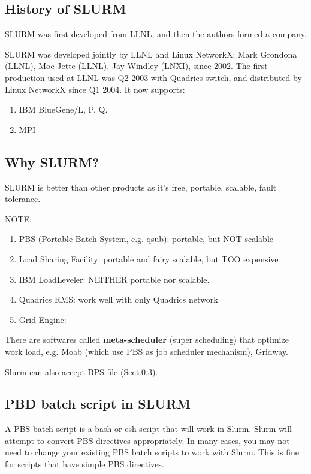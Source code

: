 \subsection{History of SLURM}
\label{sec:SLURM-history}

SLURM was first developed from LLNL, and then the authors formed a company.

SLURM was developed jointly by LLNL and Linux NetworkX: Mark Grondona (LLNL),
Moe Jette (LLNL), Jay Windley (LNXI), since 2002. The first production used at
LLNL was Q2 2003 with Quadrics switch, and distributed by Linux NetworkX since
Q1 2004. It now supports:
\begin{enumerate}
  \item IBM BlueGene/L, P, Q.
  \item MPI
\end{enumerate}


\subsection{Why SLURM?}
\label{sec:SLURM-why-it}

SLURM is better than other products as it's free, portable, scalable, fault
tolerance.

NOTE:
\begin{enumerate}
  \item PBS (Portable Batch System, e.g. qsub): portable, but NOT scalable
  \item Load Sharing Facility: portable and fairy scalable, but TOO expensive
  \item IBM LoadLeveler: NEITHER portable nor scalable.
  \item Quadrics RMS: work well with only Quadrics network
  \item Grid Engine: 
\end{enumerate}
There are softwares called {\bf meta-scheduler} (super scheduling) that optimize
work load, e.g. Moab (which use PBS as job scheduler mechanism), Gridway.  

Slurm can also accept BPS file (Sect.\ref{sec:BPS-in-SLURM}).

\subsection{PBD batch script in SLURM}
\label{sec:BPS-in-SLURM}

A PBS batch script is a bash or csh script that will work in Slurm. Slurm will
attempt to convert PBS directives appropriately. In many cases, you may not need
to change your existing PBS batch scripts to work with Slurm. This is fine for
scripts that have simple PBS directives. 

